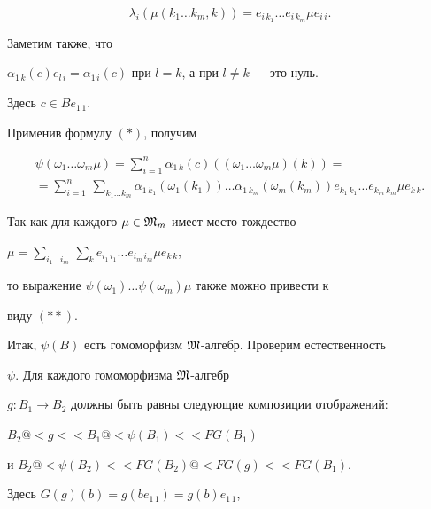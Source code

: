 \begin{pf}
\begin{equation}


\lambda_i(\mu(k_1\dotsc k_m,k))=e_{i\,k_1}\dotsc e_{i\,k_m}\mu e_{i\,i}.


\tag{$*$}


\end{equation}


Заметим также, что


$\alpha_{1\, k}(c)e_{l\,i}=


\alpha_{1\, i}(c)$ при $l=k$, а при $l\neq k$ --- это нуль.


Здесь $ c\in Be_{1\,1}$.


Применив формулу $(*)$, получим


\begin{multline}


\psi (\omega_1\dotsc \omega_m\mu)=


\sum_{i=1}^n\alpha_{1\, k}(c)((\omega_1\dotsc\omega_m\mu)(k))=\\


%


=\sum_{i=1}^n\,\sum_{k_1\dotsc k_m}\alpha_{1\, k_1}


(\omega_1(k_1))\dotsc


\alpha_{1\, k_m}(\omega_m(k_m))e_{k_1\,k_1}\dotsc e_{k_m\,k_m}


\mu e_{k\,k}.\tag{$**$}


\end{multline}


Так как для каждого $\mu\in \frak M_m$ имеет место тождество


$\mu=\sum\limits_{i_1\dotsc i_m}\,\sum\limits_{k}


e_{i_1\,i_1}\dotsc e_{i_m\,i_m}\mu e_{k\,k}$,


то выражение $\psi(\omega_1)\dotsc\psi(\omega_m)\mu$ также можно привести к


виду $(**)$.





Итак, $\psi(B)$ есть гомоморфизм $\frak M$-алгебр. Проверим естественность


$\psi$. Для каждого гомоморфизма $\frak M$-алгебр


$g:B_1\longrightarrow B_2$ должны быть равны следующие композиции отображений:


$B_2@<g<< B_1 @<{\psi (B_1)}<<FG(B_1)$


и $B_2@<{\psi (B_2)}<<FG(B_2)@<{FG(g)}<< FG(B_1)$.


Здесь $G(g)(b)=g(be_{1\,1})=g(b)e_{1\,1}$,



\end{pf}
